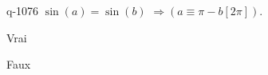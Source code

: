 \begin{truefalse}{q-1076}
$\sin(a)=\sin(b)$  $\Rightarrow \left(a\equiv \pi-b [2\pi]\right)$.
\item Vrai
\item* Faux
\end{truefalse}

